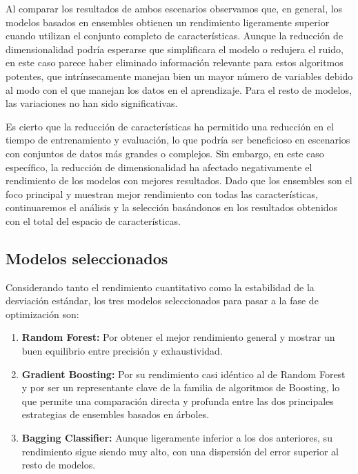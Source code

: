 \documentclass[a4paper,12pt]{article}
\begin{document}
Al comparar los resultados de ambos escenarios observamos que, en general, los modelos basados en ensembles obtienen un rendimiento ligeramente superior cuando utilizan el conjunto completo de características. Aunque la reducción de dimensionalidad podría esperarse que simplificara el modelo o redujera el ruido, en este caso parece haber eliminado información relevante para estos algoritmos potentes, que intrínsecamente manejan bien un mayor número de variables debido al modo con el que manejan los datos en el aprendizaje. Para el resto de modelos, las variaciones no han sido significativas.

Es cierto que la reducción de características ha permitido una reducción en el tiempo de entrenamiento y evaluación, lo que podría ser beneficioso en escenarios con conjuntos de datos más grandes o complejos. Sin embargo, en este caso específico, la reducción de dimensionalidad ha afectado negativamente el rendimiento de los modelos con mejores resultados. Dado que los ensembles son el foco principal y muestran mejor rendimiento con todas las características, continuaremos el análisis y la selección basándonos en los resultados obtenidos con el total del espacio de características.


\subsection{Modelos seleccionados}

Considerando tanto el rendimiento cuantitativo como la estabilidad de la desviación estándar, los tres modelos seleccionados para pasar a la fase de optimización son:

\begin{enumerate}
    \item \textbf{Random Forest:} Por obtener el mejor rendimiento general y mostrar un buen equilibrio entre precisión y exhaustividad.
    \item \textbf{Gradient Boosting:} Por su rendimiento casi idéntico al de Random Forest y por ser un representante clave de la familia de algoritmos de Boosting, lo que permite una comparación directa y profunda entre las dos principales estrategias de ensembles basados en árboles.
    \item \textbf{Bagging Classifier:} Aunque ligeramente inferior a los dos anteriores, su rendimiento sigue siendo muy alto, con una dispersión del error superior al resto de modelos.
\end{enumerate}
\end{document}
